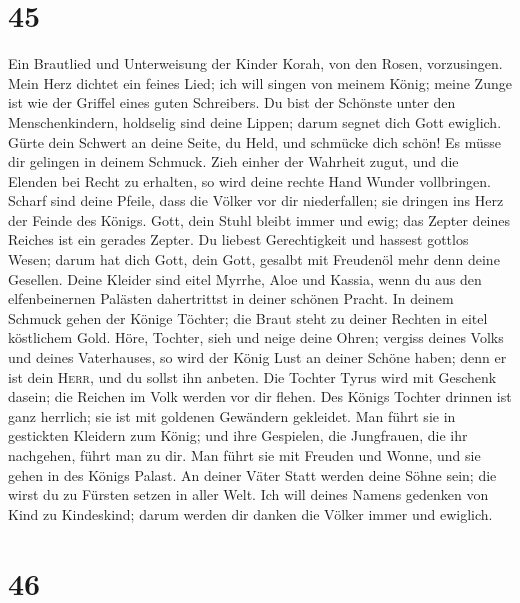 \hypertarget{section-44}{%
\section{45}\label{section-44}}

 Ein Brautlied und Unterweisung der Kinder Korah, von den
Rosen, vorzusingen.  Mein Herz dichtet ein feines Lied;
ich will singen von meinem König; meine Zunge ist wie der Griffel eines
guten Schreibers.  Du bist der Schönste unter den
Menschenkindern, holdselig sind deine Lippen; darum segnet dich Gott
ewiglich.  Gürte dein Schwert an deine Seite, du Held, und
schmücke dich schön!  Es müsse dir gelingen in deinem
Schmuck. Zieh einher der Wahrheit zugut, und die Elenden bei Recht zu
erhalten, so wird deine rechte Hand Wunder vollbringen. 
Scharf sind deine Pfeile, dass die Völker vor dir niederfallen; sie
dringen ins Herz der Feinde des Königs.  Gott, dein Stuhl
bleibt immer und ewig; das Zepter deines Reiches ist ein gerades Zepter.
 Du liebest Gerechtigkeit und hassest gottlos Wesen; darum
hat dich Gott, dein Gott, gesalbt mit Freudenöl mehr denn deine
Gesellen.  Deine Kleider sind eitel Myrrhe, Aloe und
Kassia, wenn du aus den elfenbeinernen Palästen dahertrittst in deiner
schönen Pracht.  In deinem Schmuck gehen der Könige
Töchter; die Braut steht zu deiner Rechten in eitel köstlichem Gold.
 Höre, Tochter, sieh und neige deine Ohren; vergiss
deines Volks und deines Vaterhauses,  so wird der König
Lust an deiner Schöne haben; denn er ist dein \textsc{Herr}, und du
sollst ihn anbeten.  Die Tochter Tyrus wird mit Geschenk
dasein; die Reichen im Volk werden vor dir flehen.  Des
Königs Tochter drinnen ist ganz herrlich; sie ist mit goldenen Gewändern
gekleidet.  Man führt sie in gestickten Kleidern zum
König; und ihre Gespielen, die Jungfrauen, die ihr nachgehen, führt man
zu dir.  Man führt sie mit Freuden und Wonne, und sie
gehen in des Königs Palast.  An deiner Väter Statt werden
deine Söhne sein; die wirst du zu Fürsten setzen in aller Welt.
 Ich will deines Namens gedenken von Kind zu Kindeskind;
darum werden dir danken die Völker immer und ewiglich.

\hypertarget{section-45}{%
\section{46}\label{section-45}}

